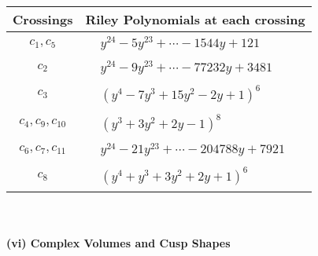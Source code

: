 \documentclass[1p]{elsarticle_modified}
\theoremstyle{definition}
\begin{document}
\begin{tabular}{m{50pt}|m{274pt}}
Crossings & \hspace{64pt}Riley Polynomials at each crossing \\
\hline $$\begin{aligned}c_{1},c_{5}\end{aligned}$$&$\begin{aligned}
&y^{24}-5 y^{23}+\cdots-1544 y+121
\end{aligned}$\\
\hline $$\begin{aligned}c_{2}\end{aligned}$$&$\begin{aligned}
&y^{24}-9 y^{23}+\cdots-77232 y+3481
\end{aligned}$\\
\hline $$\begin{aligned}c_{3}\end{aligned}$$&$\begin{aligned}
&(y^4-7 y^3+15 y^2-2 y+1)^6
\end{aligned}$\\
\hline $$\begin{aligned}c_{4},c_{9},c_{10}\end{aligned}$$&$\begin{aligned}
&(y^3+3 y^2+2 y-1)^8
\end{aligned}$\\
\hline $$\begin{aligned}c_{6},c_{7},c_{11}\end{aligned}$$&$\begin{aligned}
&y^{24}-21 y^{23}+\cdots-204788 y+7921
\end{aligned}$\\
\hline $$\begin{aligned}c_{8}\end{aligned}$$&$\begin{aligned}
&(y^4+y^3+3 y^2+2 y+1)^6
\end{aligned}$\\
\hline
\end{tabular}\\~\\
\newpage\flushleft \textbf{(vi) Complex Volumes and Cusp Shapes}
\end{document}
